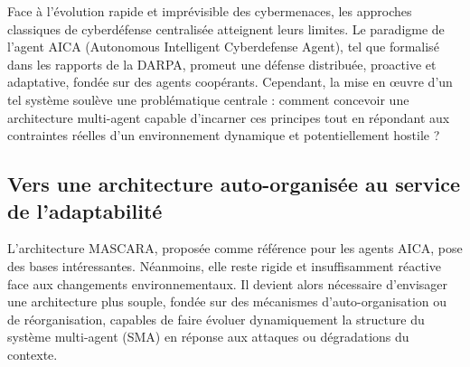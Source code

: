 \documentclass[ twoside,openright,titlepage,numbers=noenddot,headinclude,%
                footinclude=true,cleardoublepage=empty,abstractoff, %
                BCOR=5mm,paper=a4,fontsize=11pt,%
                french,american,%
                ]{scrreprt}
\begin{document}

Face à l'évolution rapide et imprévisible des cybermenaces, les approches classiques de cyberdéfense centralisée atteignent leurs limites. Le paradigme de l'agent AICA (Autonomous Intelligent Cyberdefense Agent), tel que formalisé dans les rapports de la DARPA, promeut une défense distribuée, proactive et adaptative, fondée sur des agents coopérants. Cependant, la mise en œuvre d'un tel système soulève une problématique centrale : comment concevoir une architecture multi-agent capable d'incarner ces principes tout en répondant aux contraintes réelles d'un environnement dynamique et potentiellement hostile ?

\subsection*{Vers une architecture auto-organisée au service de l'adaptabilité}

L'architecture MASCARA, proposée comme référence pour les agents AICA, pose des bases intéressantes. Néanmoins, elle reste rigide et insuffisamment réactive face aux changements environnementaux. Il devient alors nécessaire d'envisager une architecture plus souple, fondée sur des mécanismes d'auto-organisation ou de réorganisation, capables de faire évoluer dynamiquement la structure du système multi-agent (SMA) en réponse aux attaques ou dégradations du contexte.
\end{document}
